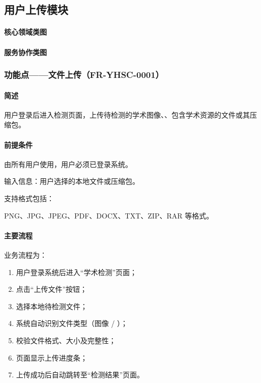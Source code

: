 \subsection{用户上传模块}

\paragraph*{核心领域类图}

\begin{center}
\resizebox{0.98\linewidth}{!}{}
\end{center}


\paragraph*{服务协作类图}

\begin{center}
\resizebox{0.98\linewidth}{!}{}
\end{center}

\subsubsection{功能点——文件上传（FR-YHSC-0001）}

\paragraph*{简述}

用户登录后进入检测页面，上传待检测的学术图像、、包含学术资源的文件或其压缩包。

\paragraph*{前提条件}

由所有用户使用，用户必须已登录系统。

输入信息：用户选择的本地文件或压缩包。

支持格式包括：

PNG、JPG、JPEG、PDF、DOCX、TXT、ZIP、RAR 等格式。

\paragraph*{主要流程}

业务流程为：

\begin{enumerate}
    \item 用户登录系统后进入“学术检测”页面；
    \item 点击“上传文件”按钮；
    \item 选择本地待检测文件；
    \item 系统自动识别文件类型（图像 / ）；
    \item 校验文件格式、大小及完整性；
    \item 页面显示上传进度条；
    \item 上传成功后自动跳转至“检测结果”页面。
\end{enumerate}

